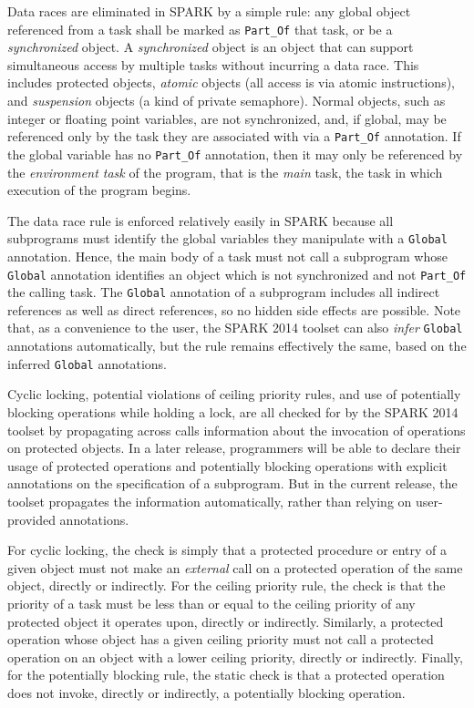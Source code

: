 \documentclass[10pt,conference,compsocconf]{IEEEtran}
\begin{document}
Data races are eliminated in SPARK by a simple rule: any global object
referenced from a task shall be marked as \verb|Part_Of| that task, or be a
\emph{synchronized} object. A \emph{synchronized} object is an object that
can support simultaneous access by multiple tasks without incurring a data
race. This includes protected objects, \emph{atomic} objects (all access is
via atomic instructions), and \emph{suspension} objects (a kind of private
semaphore). Normal objects, such as integer or floating point variables,
are not synchronized, and, if global, may be referenced only by the task
they are associated with via a \verb|Part_Of| annotation. If the global
variable has no \verb|Part_Of| annotation, then it may only be referenced
by the \emph{environment task} of the program, that is the \emph{main}
task, the task in which execution of the program begins.

The data race rule is enforced relatively easily in SPARK because all
subprograms must identify the global variables they manipulate with a
\verb|Global| annotation. Hence, the main body of a task must not call a
subprogram whose \verb|Global| annotation identifies an object which is not
synchronized and not \verb|Part_Of| the calling task. The \verb|Global|
annotation of a subprogram includes all indirect references as well as
direct references, so no hidden side effects are possible. Note that, as a
convenience to the user, the SPARK 2014 toolset can also \emph{infer}
\verb|Global| annotations automatically, but the rule remains effectively
the same, based on the inferred \verb|Global| annotations.

Cyclic locking, potential violations of ceiling priority rules, and use of
potentially blocking operations while holding a lock, are all checked for
by the SPARK 2014 toolset by propagating across calls information about the
invocation of operations on protected objects. In a later release,
programmers will be able to declare their usage of protected operations and
potentially blocking operations with explicit annotations on the
specification of a subprogram. But in the current release, the toolset
propagates the information automatically, rather than relying on
user-provided annotations.

For cyclic locking, the check is simply that a protected procedure or entry
of a given object must not make an \emph{external} call on a protected
operation of the same object, directly or indirectly. For the ceiling
priority rule, the check is that the priority of a task must be less than
or equal to the ceiling priority of any protected object it operates upon,
directly or indirectly. Similarly, a protected operation whose object has a
given ceiling priority must not call a protected operation on an object
with a lower ceiling priority, directly or indirectly. Finally, for the
potentially blocking rule, the static check is that a protected operation
does not invoke, directly or indirectly, a potentially blocking operation.
\end{document}
